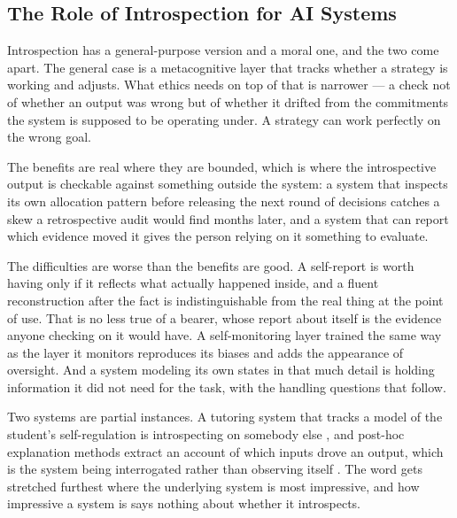 \subsection{The Role of Introspection for AI Systems}
\label{sec:5.2.3}
Introspection has a general-purpose version and a moral one, and the two come apart. The general case is a metacognitive layer that tracks whether a strategy is working and adjusts. What ethics needs on top of that is narrower — a check not of whether an output was wrong but of whether it drifted from the commitments the system is supposed to be operating under. A strategy can work perfectly on the wrong goal.

The benefits are real where they are bounded, which is where the introspective output is checkable against something outside the system: a system that inspects its own allocation pattern before releasing the next round of decisions catches a skew a retrospective audit would find months later, and a system that can report which evidence moved it gives the person relying on it something to evaluate.

The difficulties are worse than the benefits are good. A self-report is worth having only if it reflects what actually happened inside, and a fluent reconstruction after the fact is indistinguishable from the real thing at the point of use. That is no less true of a bearer, whose report about itself is the evidence anyone checking on it would have. A self-monitoring layer trained the same way as the layer it monitors reproduces its biases and adds the appearance of oversight. And a system modeling its own states in that much detail is holding information it did not need for the task, with the handling questions that follow.

Two systems are partial instances. A tutoring system that tracks a model of the student's self-regulation is introspecting on somebody else \autocite{azevedo2011hypermedia}, and post-hoc explanation methods extract an account of which inputs drove an output, which is the system being interrogated rather than observing itself \autocite{gunning2019darpas}. The word gets stretched furthest where the underlying system is most impressive, and how impressive a system is says nothing about whether it introspects.
